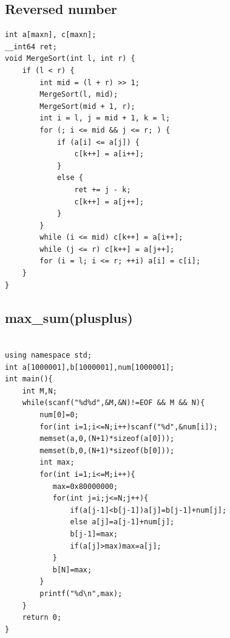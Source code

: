 \documentclass[twocolumn]{article}
\begin{document}
\begin{twocolumn}
\subsection{Reversed number}
\begin{lstlisting}[language={[ANSI]C}]
int a[maxn], c[maxn];
__int64 ret;
void MergeSort(int l, int r) {
    if (l < r) {
        int mid = (l + r) >> 1;
        MergeSort(l, mid);
        MergeSort(mid + 1, r);
        int i = l, j = mid + 1, k = l;
        for (; i <= mid && j <= r; ) {
            if (a[i] <= a[j]) {
                c[k++] = a[i++];
            }
            else {
                ret += j - k;
                c[k++] = a[j++];
            }
        }
        while (i <= mid) c[k++] = a[i++];
        while (j <= r) c[k++] = a[j++];
        for (i = l; i <= r; ++i) a[i] = c[i];
    }
}
\end{lstlisting}

\subsection{max\_sum(plusplus)}
\begin{lstlisting}[language={[ANSI]C}]

using namespace std;
int a[1000001],b[1000001],num[1000001];
int main(){
    int M,N;
    while(scanf("%d%d",&M,&N)!=EOF && M && N){
        num[0]=0;
        for(int i=1;i<=N;i++)scanf("%d",&num[i]);
        memset(a,0,(N+1)*sizeof(a[0]));
        memset(b,0,(N+1)*sizeof(b[0]));
        int max;
        for(int i=1;i<=M;i++){
           max=0x80000000;
           for(int j=i;j<=N;j++){
               if(a[j-1]<b[j-1])a[j]=b[j-1]+num[j];
               else a[j]=a[j-1]+num[j];
               b[j-1]=max;
               if(a[j]>max)max=a[j];
           }
           b[N]=max;
        }
        printf("%d\n",max);
    }
    return 0;
}
\end{lstlisting}

\end{twocolumn}
\end{document}
